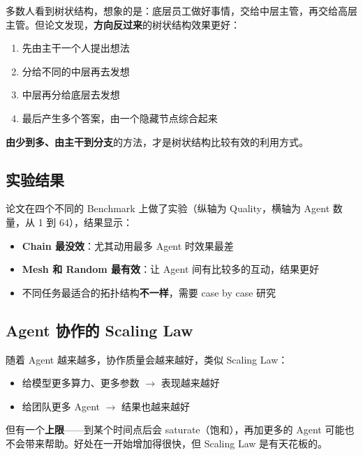 \documentclass[12pt,a4paper]{article}
\begin{document}
多数人看到树状结构，想象的是：底层员工做好事情，交给中层主管，再交给高层主管。但论文发现，\textbf{方向反过来}的树状结构效果更好：

\begin{enumerate}[leftmargin=2em]
  \item 先由主干一个人提出想法
  \item 分给不同的中层再去发想
  \item 中层再分给底层去发想
  \item 最后产生多个答案，由一个隐藏节点综合起来
\end{enumerate}

\begin{myquote}
\textbf{由少到多、由主干到分支}的方法，才是树状结构比较有效的利用方式。
\end{myquote}

\subsection{实验结果}

论文在四个不同的 Benchmark 上做了实验（纵轴为 Quality，横轴为 Agent 数量，从 1 到 64），结果显示：

\begin{itemize}[leftmargin=2em]
  \item \textbf{Chain 最没效}：尤其动用最多 Agent 时效果最差
  \item \textbf{Mesh 和 Random 最有效}：让 Agent 间有比较多的互动，结果更好
  \item 不同任务最适合的拓扑结构\textbf{不一样}，需要 case by case 研究
\end{itemize}

\subsection{Agent 协作的 Scaling Law}

随着 Agent 越来越多，协作质量会越来越好，类似 Scaling Law：

\begin{itemize}[leftmargin=2em]
  \item 给模型更多算力、更多参数 $\rightarrow$ 表现越来越好
  \item 给团队更多 Agent $\rightarrow$ 结果也越来越好
\end{itemize}

但有一个\textbf{上限}——到某个时间点后会 saturate（饱和），再加更多的 Agent 可能也不会带来帮助。好处在一开始增加得很快，但 Scaling Law 是有天花板的。
\end{document}
